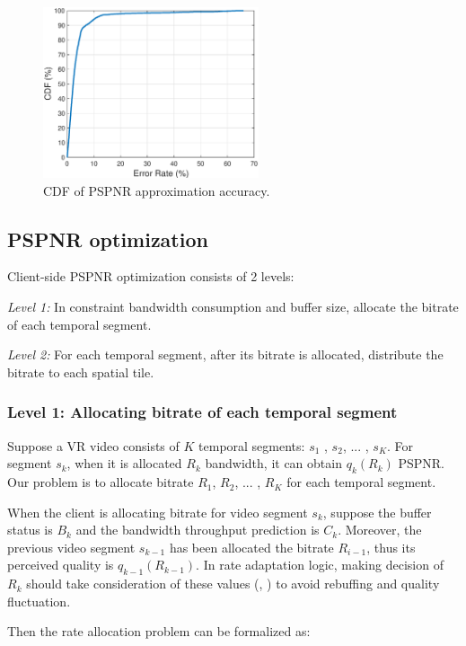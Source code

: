 \begin{figure}
  \centering
  \includegraphics[width=2.5in]{images/PSPNR_computation.eps}
  \caption{CDF of PSPNR approximation accuracy.}
  \label{PSPNR_computation}
  \end{figure}

\subsection{PSPNR optimization}

Client-side PSPNR optimization consists of 2 levels:

\emph{Level 1:} In constraint bandwidth consumption and buffer size, allocate the bitrate of each temporal segment.

\emph{Level 2:} For each temporal segment, after its bitrate is allocated, distribute the bitrate to each spatial tile.

\subsubsection{Level 1: Allocating bitrate of each temporal segment}

Suppose a VR video consists of $K$ temporal segments: $s_1$ , $s_2$, ... , $s_K$. For segment $s_k$, when it is allocated $R_k$ bandwidth, it can obtain $q_{k}(R_k)$ PSPNR. Our problem is to allocate bitrate $R_1$, $R_2$, ... , $R_K$ for each temporal segment.

When the client is allocating bitrate for video segment $s_k$, suppose the buffer status is $B_k$ and the bandwidth throughput prediction is $C_k$. Moreover, the previous video segment $s_{k-1}$ has been allocated the bitrate $R_{i-1}$, thus its perceived quality is $q_{k-1}(R_{k-1})$. In rate adaptation logic, making decision of $R_k$ should take consideration of these values (\cite{BOLA}, \cite{MPC}) to avoid rebuffing and quality fluctuation.

Then the rate allocation problem can be formalized as:

